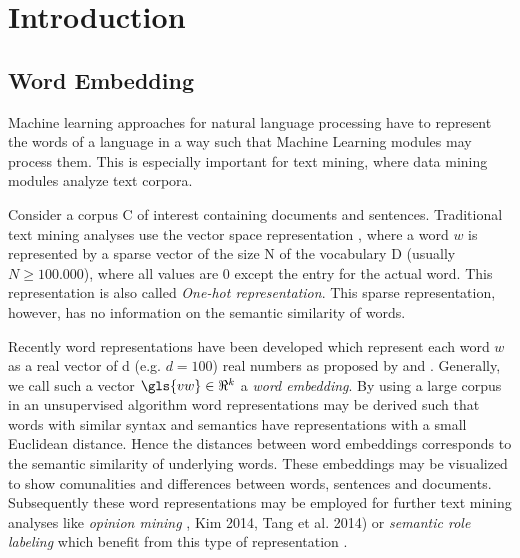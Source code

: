 \chapter{Introduction}
\label{cha:introduction}



\section{Word Embedding}


Machine learning approaches for natural language processing have to represent the words of a language in a way such that Machine Learning modules may process them. This is especially important for text mining, where data mining modules analyze text corpora. 

Consider a corpus \gls{C} %
of interest containing documents and sentences. Traditional text mining analyses use the vector space representation \citep{SaltonWongEtAl1975}, where a word $w$ is represented by a sparse vector of the size   \gls{N} %
of the vocabulary  \gls{D} %
(usually $N\ge 100.000$), where all values are 0 except the entry for the actual word. This representation is also called \emph{One-hot representation}. This sparse representation, however, has no information on the semantic similarity of words.

Recently word representations have been developed which represent each word $w$ as a real vector of \gls{d} %
(e.g. $d=100$) real numbers as proposed by \citep{CollobertWeston2008} and  \citep{MikolovSutskeverEtAl2013}. Generally, we call such a vector  
$\gls{vw}\in\Re^k$ %
a \emph{word embedding}. By using a large corpus in an unsupervised algorithm word representations may be derived such that words with similar syntax and semantics have representations with a small Euclidean distance. Hence the distances between word embeddings corresponds to the semantic similarity of underlying words. These embeddings may be visualized to show comunalities and differences between words, sentences and documents. Subsequently these word representations may be employed for further text mining analyses like \emph{opinion mining} \citep{SocherPerelyginEtAl2013}, Kim 2014, Tang et al. 2014) or \emph{semantic role labeling} \citep{ZhouXu2015} which benefit from this type of representation \citep{CollobertWestonEtAl2011}.

